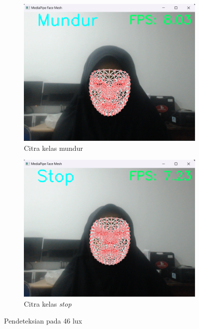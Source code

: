 \begin{figure}[H]
  \begin{subfigure}{0.3\textwidth}
      \centering
      \includegraphics[width=\linewidth]{gambar/46 mundur.png}
      \caption{Citra kelas mundur}
      \label{fig:image4}
  \end{subfigure}
  \hfill
  \begin{subfigure}{0.3\textwidth}
      \centering
      \includegraphics[width=\linewidth]{gambar/46 stop.png}
      \caption{Citra kelas \emph{stop}}
      \label{fig:image5}
  \end{subfigure}
  \caption{Pendeteksian pada 46 lux}
  \label{fig:46lux}
\end{figure}

